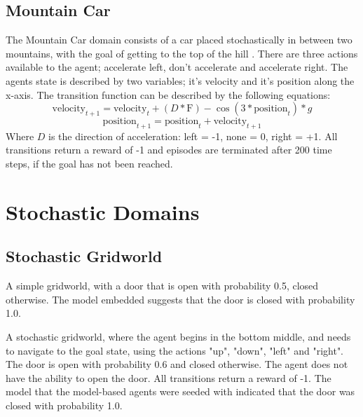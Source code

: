 \subsection{Mountain Car}
The Mountain Car domain consists of a car placed stochastically in between two mountains, with the goal of getting to the top of the hill \cite{1606.01540, Moore90efficientmemory-based}. There are three actions available to the agent; accelerate left, don't accelerate and accelerate right. The agents state is described by two variables; it's velocity and it's position along the x-axis. 
The transition function can be described by the following equations:
\begin{equation}
\label{eqn:mcdnl}
\text{velocity}_{t+1} = \text{velocity}_t + (D * \text{F}) - \cos{(3*\text{position}_t)} * g
\end{equation}
\begin{equation}
\label{eqn:mcdnr}
\text{position}_{t+1} = \text{position}_t + \text{velocity}_{t+1}
\end{equation}
Where $D$ is the direction of acceleration: left = -1, none = 0, right = +1.
All transitions return a reward of -1 and episodes are terminated after 200 time steps, if the goal has not been reached.




\section{Stochastic Domains}


\subsection{Stochastic Gridworld}
A simple gridworld, with a door that is open with probability 0.5, closed otherwise. The model embedded suggests that the door is closed with probability 1.0.

A stochastic gridworld, where the agent begins in the bottom middle, and needs to navigate to the goal state, using the actions "up", "down", "left" and "right". The door is open with probability 0.6 and closed otherwise. The agent does not have the ability to open the door. All transitions return a reward of -1. The model that the model-based agents were seeded with indicated that the door was closed with probability 1.0.

